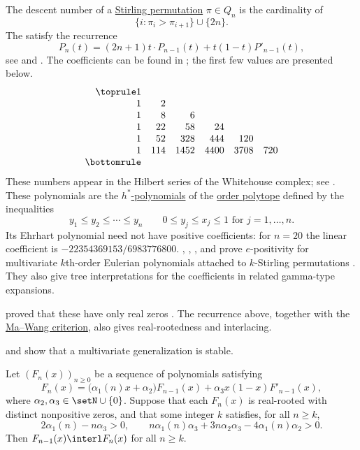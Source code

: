 \begin{example*}

The descent number of a \hyperref[permutationsStirling]{Stirling permutation}
\(\pi \in Q_n\) is the cardinality of
\[
 \{ i : \pi_i \gt \pi_{i+1} \} \cup \{2n\}.
\]
The 
\label{stirlingPermutationDescentPolynomial} satisfy the recurrence
\begin{equation}
 P_n(t) = (2n+1)t \cdot P_{n-1}(t) + t(1-t) P'_{n-1}(t),
\end{equation}
see \cite[Eq.~13]{Carlitz1965} and \cite[Thm.~2.1]{GesselStanley1978}.
The coefficients can be found in ; the first few values are
presented below.
\[
\begin{array}{rrrrrr}
\toprule
 1  \\
 1 & 2  \\
 1 & 8 & 6 \\
 1 & 22 & 58 & 24 \\
 1 & 52 & 328 & 444 & 120 \\
 1 & 114 & 1452 & 4400 & 3708 & 720 \\
\bottomrule
\end{array}
\]
These numbers appear in the Hilbert series of the Whitehouse complex;
see \cite{Readdy2005}.  These polynomials are the
\hyperref[hStarPolynomial]{$h^*$-polynomials} of the
\hyperref[orderPolytope]{order polytope} defined by the inequalities
\[
 y_1 \leq y_2 \leq \dotsb \leq y_n \qquad 0 \leq y_j \leq x_j \leq 1 \text{ for } j=1,\dotsc,n.
\]
Its Ehrhart polynomial need not have positive coefficients: for $n=20$
the linear coefficient is $-22354369153/6983776800$.
, , , and
 prove $e$-positivity for multivariate $k$th-order
Eulerian polynomials attached to $k$-Stirling permutations
\cite{MaMaYehYeh2021x}.  They also give tree interpretations for the
coefficients in related gamma-type expansions.

 proved that these have only real zeros \cite{Bona2009}.
The recurrence above, together with the
\hyperref[maWangDerivativeCriterion]{Ma--Wang criterion}, also gives
real-rootedness and interlacing.

 and  \cite[Thm.~3.3]{HaglundVisontai2012}
show that a multivariate generalization is stable.
\end{example*}

\begin{theorem*}
\label{deyInterlacingCriterion}
Let $(F_n(x))_{n\geq 0}$ be a sequence of polynomials satisfying
\[
  F_n(x)=\bigl(\alpha_1(n)x+\alpha_2\bigr)F_{n-1}(x)
  +\alpha_3x(1-x)F'_{n-1}(x),
\]
where $\alpha_2,\alpha_3\in\setN\cup\{0\}$. Suppose that each
$F_n(x)$ is real-rooted with distinct nonpositive zeros, and that
some integer $k$ satisfies, for all $n\geq k$,
\[
  2\alpha_1(n)-n\alpha_3>0,
  \qquad
  n\alpha_1(n)\alpha_3+3n\alpha_2\alpha_3
  -4\alpha_1(n)\alpha_2>0.
\]
Then $F_{n-1}(x)\interl F_n(x)$ for all $n\geq k$.
\end{theorem*}

